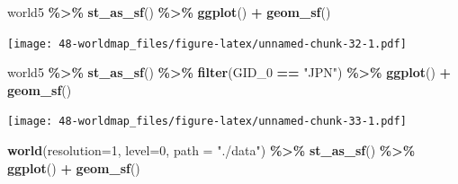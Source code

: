 \documentclass[
  xelatex, ja=standard]{bxjsbook}
\newenvironment{Shaded}{\begin{snugshade}}{\end{snugshade}}
\newcommand{\AttributeTok}[1]{\textcolor[rgb]{0.13,0.29,0.53}{#1}}
\newcommand{\CommentTok}[1]{\textcolor[rgb]{0.56,0.35,0.01}{\textit{#1}}}
\newcommand{\DecValTok}[1]{\textcolor[rgb]{0.00,0.00,0.81}{#1}}
\newcommand{\FunctionTok}[1]{\textcolor[rgb]{0.13,0.29,0.53}{\textbf{#1}}}
\newcommand{\NormalTok}[1]{#1}
\newcommand{\OtherTok}[1]{\textcolor[rgb]{0.56,0.35,0.01}{#1}}
\newcommand{\SpecialCharTok}[1]{\textcolor[rgb]{0.81,0.36,0.00}{\textbf{#1}}}
\newcommand{\StringTok}[1]{\textcolor[rgb]{0.31,0.60,0.02}{#1}}
\theoremstyle{definition}
\theoremstyle{definition}
\theoremstyle{definition}
\theoremstyle{definition}
\theoremstyle{remark}
\begin{document}
\begin{Shaded}
\end{Shaded}

\begin{Shaded}
\begin{Highlighting}[]
\NormalTok{world5 }\SpecialCharTok{\%\textgreater{}\%} \FunctionTok{st\_as\_sf}\NormalTok{() }\SpecialCharTok{\%\textgreater{}\%} \FunctionTok{ggplot}\NormalTok{() }\SpecialCharTok{+} \FunctionTok{geom\_sf}\NormalTok{()}
\end{Highlighting}
\end{Shaded}

\texttt{[image: 48-worldmap\_files/figure-latex/unnamed-chunk-32-1.pdf]}

\begin{Shaded}
\begin{Highlighting}[]
\NormalTok{world5 }\SpecialCharTok{\%\textgreater{}\%} 
  \FunctionTok{st\_as\_sf}\NormalTok{() }\SpecialCharTok{\%\textgreater{}\%} \FunctionTok{filter}\NormalTok{(GID\_0 }\SpecialCharTok{==} \StringTok{"JPN"}\NormalTok{) }\SpecialCharTok{\%\textgreater{}\%} 
  \FunctionTok{ggplot}\NormalTok{() }\SpecialCharTok{+} \FunctionTok{geom\_sf}\NormalTok{()}
\end{Highlighting}
\end{Shaded}

\texttt{[image: 48-worldmap\_files/figure-latex/unnamed-chunk-33-1.pdf]}

\begin{Shaded}
\begin{Highlighting}[]
\FunctionTok{world}\NormalTok{(}\AttributeTok{resolution=}\DecValTok{1}\NormalTok{, }\AttributeTok{level=}\DecValTok{0}\NormalTok{, }\AttributeTok{path =} \StringTok{"./data"}\NormalTok{) }\SpecialCharTok{\%\textgreater{}\%}
  \FunctionTok{st\_as\_sf}\NormalTok{() }\SpecialCharTok{\%\textgreater{}\%} \FunctionTok{ggplot}\NormalTok{() }\SpecialCharTok{+} \FunctionTok{geom\_sf}\NormalTok{()}
\end{Highlighting}
\end{Shaded}
\end{document}
